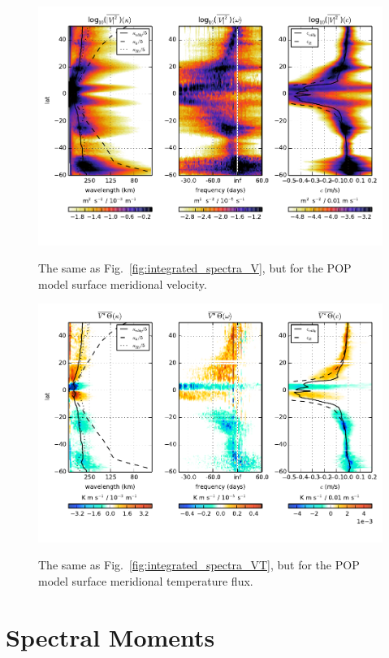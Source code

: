 \documentclass[10pt]{article}
\begin{document}
\begin{figure}[t]
  \noindent\includegraphics{../figures/POP_50degwide/integrated_spectra_V.pdf}\\
  \caption{The same as Fig.~\ref{fig:integrated_spectra_V}, but for the POP model surface meridional velocity.}
  \label{fig:integrated_spectra_V_POP}
\end{figure}

\begin{figure}[t]
  \noindent\includegraphics{../figures/POP_50degwide/integrated_spectra_VT.pdf}\\
  \caption{The same as Fig.~\ref{fig:integrated_spectra_VT}, but for the POP model surface meridional temperature flux.}
  \label{fig:integrated_spectra_VT_POP}
\end{figure}


\section{Spectral Moments}
\end{document}
